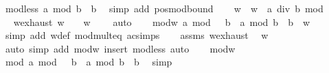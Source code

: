 \begin{isabellebody}
\ mod{\isacharunderscore}{\kern0pt}less{\isacharcolon}{\kern0pt}\ {\isachardoublequoteopen}a\ mod\ b\ {\isacharless}{\kern0pt}\ b{\isachardoublequoteclose}\ \isamarkupfalse%
\ {\isacharparenleft}{\kern0pt}simp\ add{\isacharcolon}{\kern0pt}\ pos{\isacharunderscore}{\kern0pt}mod{\isacharunderscore}{\kern0pt}bound{\isacharparenright}{\kern0pt}\isanewline
\ \ \isamarkupfalse%
\ w\ \ {\isachardoublequoteopen}w\ {\isacharequal}{\kern0pt}\ a\ div\ b\ mod\ {}{\isachardoublequoteclose}\isanewline
\ \ \isamarkupfalse%
\ \isamarkupfalse%
\ w{\isacharunderscore}{\kern0pt}exhaust{\isacharcolon}{\kern0pt}\ {\isachardoublequoteopen}w\ {\isacharequal}{\kern0pt}\ {}\ {\isasymor}\ w\ {\isacharequal}{\kern0pt}\ {}{\isachardoublequoteclose}\ \isamarkupfalse%
\ auto\isanewline
\ \ \isamarkupfalse%
\ mod{\isacharunderscore}{\kern0pt}w{\isacharcolon}{\kern0pt}\ {\isachardoublequoteopen}a\ mod\ {\isacharparenleft}{\kern0pt}{}\ {\isacharasterisk}{\kern0pt}\ b{\isacharparenright}{\kern0pt}\ {\isacharequal}{\kern0pt}\ a\ mod\ b\ {\isacharplus}{\kern0pt}\ b\ {\isacharasterisk}{\kern0pt}\ w{\isachardoublequoteclose}\isanewline
\ \ \ \ \isamarkupfalse%
\ {\isacharparenleft}{\kern0pt}simp\ add{\isacharcolon}{\kern0pt}\ w{\isacharunderscore}{\kern0pt}def\ mod{\isacharunderscore}{\kern0pt}mult{}{\isacharunderscore}{\kern0pt}eq\ ac{\isacharunderscore}{\kern0pt}simps{\isacharparenright}{\kern0pt}\isanewline
\ \ \isamarkupfalse%
\ assms\ w{\isacharunderscore}{\kern0pt}exhaust\ \isamarkupfalse%
\ {\isachardoublequoteopen}w\ {\isacharequal}{\kern0pt}\ {}{\isachardoublequoteclose}\isanewline
\ \ \ \ \isamarkupfalse%
\ {\isacharparenleft}{\kern0pt}auto\ simp\ add{\isacharcolon}{\kern0pt}\ mod{\isacharunderscore}{\kern0pt}w{\isacharparenright}{\kern0pt}\ {\isacharparenleft}{\kern0pt}insert\ mod{\isacharunderscore}{\kern0pt}less{\isacharcomma}{\kern0pt}\ auto{\isacharparenright}{\kern0pt}\isanewline
\ \ \isamarkupfalse%
\ mod{\isacharunderscore}{\kern0pt}w\ \isamarkupfalse%
\ mod{\isacharcolon}{\kern0pt}\ {\isachardoublequoteopen}a\ mod\ {\isacharparenleft}{\kern0pt}{}\ {\isacharasterisk}{\kern0pt}\ b{\isacharparenright}{\kern0pt}\ {\isacharequal}{\kern0pt}\ a\ mod\ b\ {\isacharplus}{\kern0pt}\ b{\isachardoublequoteclose}\ \isamarkupfalse%
\ simp\isanewline
\ \ \isamarkupfalse%

\end{isabellebody}
